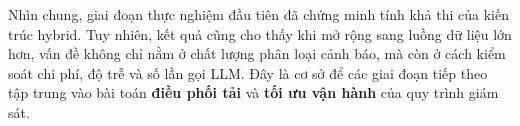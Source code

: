 Nhìn chung, giai đoạn thực nghiệm đầu tiên đã chứng minh tính khả thi của kiến trúc hybrid. Tuy nhiên, kết quả cũng cho thấy khi mở rộng sang luồng dữ liệu lớn hơn, vấn đề không chỉ nằm ở chất lượng phân loại cảnh báo, mà còn ở cách kiểm soát chi phí, độ trễ và số lần gọi LLM. Đây là cơ sở để các giai đoạn tiếp theo tập trung vào bài toán \textbf{điều phối tải} và \textbf{tối ưu vận hành} của quy trình giám sát.




